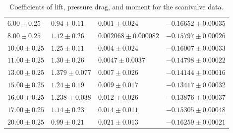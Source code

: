 \documentclass[runningheads]{llncs}
\begin{document}
\begin{table}[h]
\begin{tabular}{p{3cm}p{3cm}p{3cm}p{3cm}}
 $6.00\pm0.25$ & $0.94\pm0.11$ & $0.001\pm0.024$ &  $-0.16652\pm0.00035$ \\
 $8.00\pm0.25$ & $1.12\pm0.26$ &  $0.002068\pm0.000082$ & $-0.15797\pm0.00026$ \\
$10.00\pm0.25$ & $1.25\pm0.11$ & $0.004\pm0.024$ & $-0.16007\pm0.00033$ \\
$11.00\pm0.25$ & $1.30\pm0.26$ &  $0.0047\pm0.0037$ &  $-0.14798\pm0.00022$ \\
$13.00\pm0.25$ & $1.379\pm0.077$ & $0.007\pm0.026$ & $-0.14144\pm0.00016$ \\
$15.00\pm0.25$ & $1.24\pm0.19$ & $0.009\pm0.017$ & $-0.13417\pm0.00032$ \\
$16.00\pm0.25$ & $1.238\pm0.038$ & $0.012\pm0.026$ & $-0.13876\pm0.00037$ \\
$17.00\pm0.25$ &  $1.14\pm0.23$ & $0.014\pm0.011$ &  $-0.15305\pm0.00048$ \\
$20.00\pm0.25$ & $0.99\pm0.21$ & $0.021\pm0.013$ & $-0.16259\pm0.00021$ \\
\bottomrule
\end{tabular}
\caption{Coefficients of lift, pressure drag, and moment for the scanivalve data.}
\label{tab:scani_coeff}
\end{table}
\end{document}
